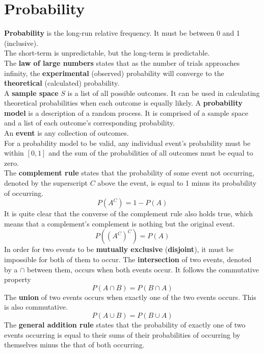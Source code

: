 \documentclass[../AP_Statistics.tex]{subfiles}
\begin{document}
	\chapter{Probability}
		\textbf{Probability} is the long-run relative frequency. It must be between 0 and 1 (inclusive). \\
		The short-term is unpredictable, but the long-term is predictable. \\
		The \textbf{law of large numbers} states that as the number of trials approaches infinity, the \textbf{experimental} (observed) probability will converge to the \textbf{theoretical} (calculated) probability. \\
		A \textbf{sample space} $S$ is a list of all possible outcomes. It can be used in calculating theoretical probabilities when each outcome is equally likely.
		A \textbf{probability model} is a description of a random process. It is comprised of a sample space and a list of each outcome's corresponding probability. \\
		An \textbf{event} is any collection of outcomes. \\
		For a probability model to be valid, any individual event's probability must be within $[0, 1]$ and the sum of the probabilities of all outcomes must be equal to zero. \\
		The \textbf{complement rule} states that the probability of some event not occurring, denoted by the superscript $C$ above the event, is equal to 1 minus its probability of occurring. \\
		$$P\left(A^C\right) = 1 - P(A)$$
		It is quite clear that the converse of the complement rule also holds true, which means that a complement's complement is nothing but the original event.
		$$P\left(\left(A^C\right)^C\right) = P(A)$$
		In order for two events to be \textbf{mutually exclusive} (\textbf{disjoint}), it must be impossible for both of them to occur.
		The \textbf{intersection} of two events, denoted by a $\cap$ between them, occurs when both events occur. It follows the commutative property
		$$P(A\cap B) = P(B\cap A)$$
		The \textbf{union} of two events occurs when exactly one of the two events occurs. This is also commutative. \\
		$$P(A\cup B) = P(B\cup A)$$
		The \textbf{general addition rule} states that the probability of exactly one of two events occurring is equal to their sums of their probabilities of occurring by themselves minus the that of both occurring.
\end{document}
